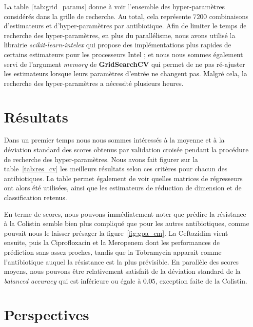 \documentclass[11pt]{article}
\begin{document}
  La table~\ref{tab:grid_params} donne à voir l'ensemble des hyper-paramètres considérés dans la grille de recherche.
  Au total, cela représente $7200$ combinaisons d'estimateurs et d'hyper-paramètres par antibiotique.
  Afin de limiter le temps de recherche des hyper-paramètres, en plus du parallélisme, nous avons utilisé la librairie \textit{scikit-learn-intelex} qui propose des implémentations plus rapides de certains estimateurs pour les processeurs Intel ;
  et nous nous sommes également servi de l'argument \textit{memory} de \textbf{GridSearchCV} qui permet de ne pas ré-ajuster les estimateurs lorsque leurs paramètres d'entrée ne changent pas.
  Malgré cela, la recherche des hyper-paramètres a nécessité plusieurs heures.

\hypertarget{resultats}{%
\section{Résultats}\label{resultats}}

  Dans un premier temps nous nous sommes intéressés à la moyenne et à la déviation standard des scores obtenus par validation croisée pendant la procédure de recherche des hyper-paramètres.
  Nous avons fait figurer sur la table~\ref{tab:res_cv} les meilleurs résultats selon ces critères pour chacun des antibiotiques.
  La table permet également de voir quelles matrices de régresseurs ont alors été utilisées, ainsi que les estimateurs de réduction de dimension et de classification retenus.

  

  En terme de scores, nous pouvons immédiatement noter que prédire la résistance à la Colistin semble bien plus compliqué que pour les autres antibiotiques, comme pouvait nous le laisser présager la figure~\ref{fig:gpa_cm}.
  La Ceftazidim vient ensuite, puis la Ciprofloxacin et la Meropenem dont les performances de prédiction sans assez proches, tandis que la Tobramycin apparait comme l'antibiotique auquel la résistance est la plus prévisible.
  En parallèle des scores moyens, nous pouvons être relativement satisfait de la déviation standard de la \textit{balanced accuracy} qui est inférieure ou égale à $0.05$, exception faite de la Colistin.

\hypertarget{perspectives}{%
\section{Perspectives}\label{perspectives}}
\end{document}
